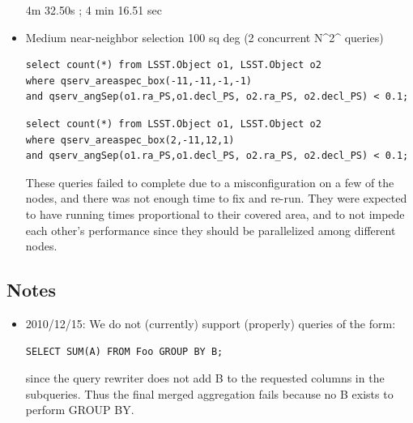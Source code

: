 \documentclass[DM,toc]{lsstdoc}
\begin{document}
\begin{itemize}
4m 32.50s ; 4 min 16.51 sec

\item
  Medium near-neighbor selection 100 sq deg (2 concurrent N\^{}2\^{}
  queries)

\begin{verbatim}
select count(*) from LSST.Object o1, LSST.Object o2
where qserv_areaspec_box(-11,-11,-1,-1)
and qserv_angSep(o1.ra_PS,o1.decl_PS, o2.ra_PS, o2.decl_PS) < 0.1;
\end{verbatim}

\begin{verbatim}
select count(*) from LSST.Object o1, LSST.Object o2
where qserv_areaspec_box(2,-11,12,1)
and qserv_angSep(o1.ra_PS,o1.decl_PS, o2.ra_PS, o2.decl_PS) < 0.1;
\end{verbatim}

These queries failed to complete due to a misconfiguration on a few of
the nodes, and there was not enough time to fix and re-run. They were
expected to have running times proportional to their covered area, and
to not impede each other's performance since they should be parallelized
among different nodes.
\end{itemize}

\subsection{Notes}\label{notes}

\begin{itemize}
\item
  2010/12/15: We do not (currently) support (properly) queries of the
  form:

\begin{verbatim}
SELECT SUM(A) FROM Foo GROUP BY B;
\end{verbatim}

  since the query rewriter does not add B to the requested columns in
  the subqueries. Thus the final merged aggregation fails because no B
  exists to perform GROUP BY.
\end{itemize}
\end{document}
